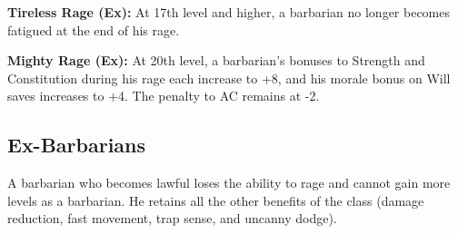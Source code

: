 \textbf{Tireless Rage (Ex):} At 17th level and higher, a barbarian no longer becomes 
fatigued at the end of his rage.

\textbf{Mighty Rage (Ex):} At 20th level, a barbarian's bonuses to Strength and 
Constitution during his rage each increase to +8, and his morale bonus on Will 
saves increases to +4. The penalty to AC remains at -2.

\subsection{Ex-Barbarians}

A barbarian who becomes lawful loses the ability to rage and cannot gain more levels 
as a barbarian. He retains all the other benefits of the class (damage reduction, 
fast movement, trap sense, and uncanny dodge).